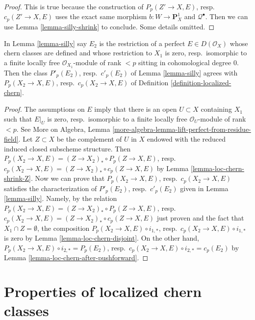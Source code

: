 \begin{proof}
This is true because the construction of
$P_p(Z' \to X, E)$, resp.\ $c_p(Z' \to X, E)$
uses the exact same morphism $b : W \to \mathbf{P}^1_X$
and $\mathcal{Q}^\bullet$. Then we can use
Lemma \ref{lemma-silly-shrink} to conclude.
Some details omitted.
\end{proof}

\begin{lemma}
\label{lemma-loc-chern-agree}
In Lemma \ref{lemma-silly} say $E_2$ is the restriction of a perfect
$E \in D(\mathcal{O}_X)$ whose chern classes are defined and
whose restriction to $X_1$ is zero, resp.\ isomorphic to a
finite locally free $\mathcal{O}_{X_1}$-module
of rank $< p$ sitting in cohomological degree $0$. Then the
class $P'_p(E_2)$, resp.\ $c'_p(E_2)$ of Lemma \ref{lemma-silly} agrees with
$P_p(X_2 \to X, E)$, resp.\ $c_p(X_2 \to X, E)$ of
Definition \ref{definition-localized-chern}.
\end{lemma}

\begin{proof}
The assumptions on $E$ imply that there is an open $U \subset X$
containing $X_1$ such that $E|_U$ is zero, resp.\ isomorphic to a finite locally
free $\mathcal{O}_U$-module of rank $< p$. See More on Algebra, Lemma
\ref{more-algebra-lemma-lift-perfect-from-residue-field}.
Let $Z \subset X$ be the complement of $U$ in $X$ endowed with
the reduced induced closed subscheme structure. Then
$P_p(X_2 \to X, E) = (Z \to X_2)_* \circ P_p(Z \to X, E)$,
resp.\ $c_p(X_2 \to X, E) = (Z \to X_2)_* \circ c_p(Z \to X, E)$
by Lemma \ref{lemma-loc-chern-shrink-Z}.
Now we can prove that $P_p(X_2 \to X, E)$, resp.\ $c_p(X_2 \to X, E)$
satisfies the characterization of $P'_p(E_2)$, resp.\ $c'_p(E_2)$
given in Lemma \ref{lemma-silly}. Namely, by the relation
$P_p(X_2 \to X, E) = (Z \to X_2)_* \circ P_p(Z \to X, E)$,
resp.\ $c_p(X_2 \to X, E) = (Z \to X_2)_* \circ c_p(Z \to X, E)$
just proven and the fact that $X_1 \cap Z = \emptyset$,
the composition $P_p(X_2 \to X, E) \circ i_{1, *}$,
resp.\ $c_p(X_2 \to X, E) \circ i_{1, *}$ is zero
by Lemma \ref{lemma-loc-chern-disjoint}.
On the other hand,
$P_p(X_2 \to X, E) \circ i_{2, *} = P_p(E_2)$,
resp.\ $c_p(X_2 \to X, E) \circ i_{2, *} = c_p(E_2)$
by Lemma \ref{lemma-loc-chern-after-pushforward}.
\end{proof}





\section{Properties of localized chern classes}
\label{section-properties-loc-chern}

